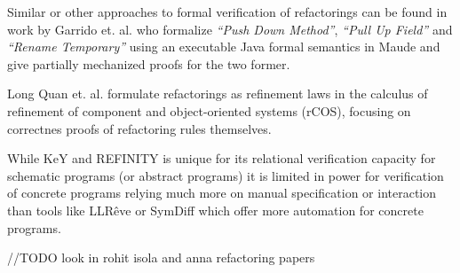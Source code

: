 Similar or other approaches to formal verification of refactorings can be found in work by
Garrido et. al. \cite{garrido2006formal} who formalize \emph{``Push Down Method''},
\emph{``Pull Up Field''} and \emph{``Rename Temporary''} using an executable
Java formal semantics in Maude and give partially mechanized proofs for the two former.

Long Quan et. al. \cite{DBLP:conf/isola/QuanQL08} formulate refactorings as refinement
laws in the calculus of refinement of component and object-oriented systems (rCOS),
focusing on correctnes proofs of refactoring rules themselves.

While KeY and REFINITY is unique for its relational verification capacity for
schematic programs (or abstract programs) it is limited in power for verification
of concrete programs relying much more on manual specification or interaction \cite{DBLP:conf/aplas/Steinhofel20}
than tools like LLRêve \cite{DBLP:journals/jar/KieferKU18} or SymDiff \cite{DBLP:conf/cav/LahiriHKR12}
which offer more automation for concrete programs.



//TODO look in rohit isola and anna refactoring papers
